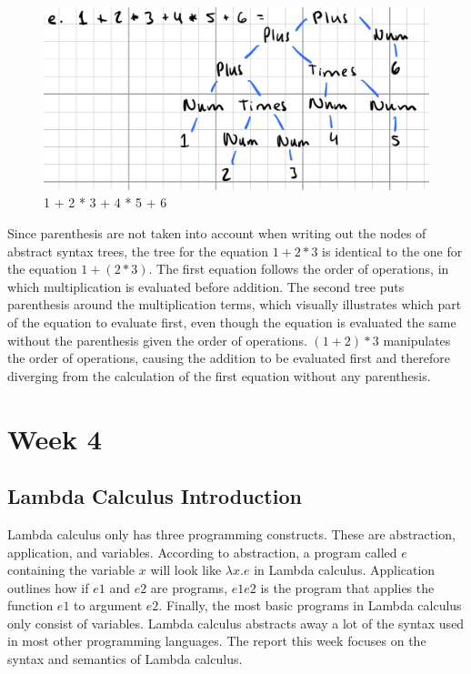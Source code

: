 \documentclass{article}
\theoremstyle{theorem}
\theoremstyle{definition}
\theoremstyle{remark}
\begin{document}
\begin{figure}[H]
\begin{center}
\includegraphics[scale=0.4]{img/A5.png}
\end{center}
\caption{1 + 2 * 3 + 4 * 5 + 6}\label{A5}
\end{figure}

Since parenthesis are not taken into account when writing out the nodes of abstract syntax trees, the tree for the equation $1+2*3$ is identical to the one for the equation $1+(2*3)$. The first equation follows the order of operations, in which multiplication is evaluated before addition. The second tree puts parenthesis around the multiplication terms, which visually illustrates which part of the equation to evaluate first, even though the equation is evaluated the same without the parenthesis given the order of operations. $(1+2)*3$ manipulates the order of operations, causing the addition to be evaluated first and therefore diverging from the calculation of the first equation without any parenthesis. 

\section{Week 4}

\subsection{Lambda Calculus Introduction}

Lambda calculus only has three programming constructs. These are abstraction, application, and variables. According to abstraction, a program called $e$ containing the variable $x$ will look like $\lambda x. e$ in Lambda calculus. Application outlines how if $e1$ and $e2$ are programs, $e1 e2$  is the program that applies the function $e1$ to argument $e2$. Finally, the most basic programs in Lambda calculus only consist of variables. Lambda calculus abstracts away a lot of the syntax used in most other programming languages. The report this week focuses on the syntax and semantics of Lambda calculus.
\end{document}
